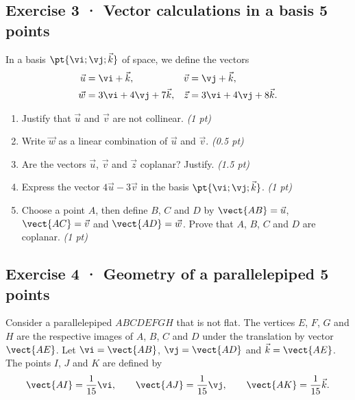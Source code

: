 \mxnewpage{}

\subsection*{Exercise 3 · Vector calculations in a basis \hfill 5 points}In a basis $\pt{\vi;\vj;\vec k}$ of space, we define the vectors
\[\begin{aligned}\vec u&=\vi+\vec k,&\vec v&=\vj+\vec k,\\
\vec w&=3\vi+4\vj+7\vec k,&\vec z&=3\vi+4\vj+8\vec k.\end{aligned}\]

\begin{enumerate}

\item Justify that $\vec u$ and $\vec v$ are not collinear. \hfill\textit{(1 pt)}

\item Write $\vec w$ as a linear combination of $\vec u$ and $\vec v$. \hfill\textit{(0.5 pt)}

\item Are the vectors $\vec u$, $\vec v$ and $\vec z$ coplanar? Justify. \hfill\textit{(1.5 pt)}

\item Express the vector $4\vec u-3\vec v$ in the basis $\pt{\vi;\vj;\vec k}$. \hfill\textit{(1 pt)}

\item Choose a point $A$, then define $B$, $C$ and $D$ by $\vect{AB}=\vec u$, $\vect{AC}=\vec v$ and $\vect{AD}=\vec w$. Prove that $A$, $B$, $C$ and $D$ are coplanar. \hfill\textit{(1 pt)}

\end{enumerate}

\subsection*{Exercise 4 · Geometry of a parallelepiped \hfill 5 points}Consider a parallelepiped $ABCDEFGH$ that is not flat. The vertices $E$, $F$, $G$ and $H$ are the respective images of $A$, $B$, $C$ and $D$ under the translation by vector $\vect{AE}$.
Let $\vi=\vect{AB}$, $\vj=\vect{AD}$ and $\vec k=\vect{AE}$.
The points $I$, $J$ and $K$ are defined by
\[\vect{AI}=\frac1{15}\vi,\qquad\vect{AJ}=\frac1{15}\vj,\qquad\vect{AK}=\frac1{15}\vec k.\]


